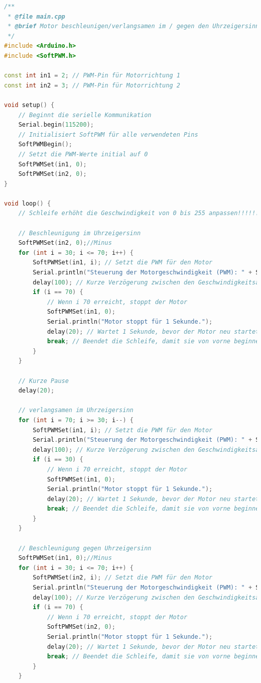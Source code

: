 \documentclass{vorlage-design-main}
\begin{document}
\begin{lstlisting}[language={C++}]
/**
 * @file main.cpp
 * @brief Motor beschleunigen/verlangsamen im / gegen den Uhrzeigersinn
 */
#include <Arduino.h>
#include <SoftPWM.h>

const int in1 = 2; // PWM-Pin für Motorrichtung 1
const int in2 = 3; // PWM-Pin für Motorrichtung 2

void setup() {
    // Beginnt die serielle Kommunikation
    Serial.begin(115200);
    // Initialisiert SoftPWM für alle verwendeten Pins
    SoftPWMBegin();
    // Setzt die PWM-Werte initial auf 0
    SoftPWMSet(in1, 0);
    SoftPWMSet(in2, 0);
}

void loop() {
    // Schleife erhöht die Geschwindigkeit von 0 bis 255 anpassen!!!!!!!!
    
    // Beschleunigung im Uhrzeigersinn
    SoftPWMSet(in2, 0);//Minus
    for (int i = 30; i <= 70; i++) {
        SoftPWMSet(in1, i); // Setzt die PWM für den Motor
        Serial.println("Steuerung der Motorgeschwindigkeit (PWM): " + String(i));
        delay(100); // Kurze Verzögerung zwischen den Geschwindigkeitsänderungen
        if (i == 70) {
            // Wenn i 70 erreicht, stoppt der Motor
            SoftPWMSet(in1, 0);
            Serial.println("Motor stoppt für 1 Sekunde.");
            delay(20); // Wartet 1 Sekunde, bevor der Motor neu startet
            break; // Beendet die Schleife, damit sie von vorne beginnen kann
        }
    }

    // Kurze Pause
    delay(20);

    // verlangsamen im Uhrzeigersinn
    for (int i = 70; i >= 30; i--) {
        SoftPWMSet(in1, i); // Setzt die PWM für den Motor
        Serial.println("Steuerung der Motorgeschwindigkeit (PWM): " + String(i));
        delay(100); // Kurze Verzögerung zwischen den Geschwindigkeitsänderungen
        if (i == 30) {
            // Wenn i 70 erreicht, stoppt der Motor
            SoftPWMSet(in1, 0);
            Serial.println("Motor stoppt für 1 Sekunde.");
            delay(20); // Wartet 1 Sekunde, bevor der Motor neu startet
            break; // Beendet die Schleife, damit sie von vorne beginnen kann
        }
    }

    // Beschleunigung gegen Uhrzeigersinn
    SoftPWMSet(in1, 0);//Minus
    for (int i = 30; i <= 70; i++) {
        SoftPWMSet(in2, i); // Setzt die PWM für den Motor
        Serial.println("Steuerung der Motorgeschwindigkeit (PWM): " + String(i));
        delay(100); // Kurze Verzögerung zwischen den Geschwindigkeitsänderungen
        if (i == 70) {
            // Wenn i 70 erreicht, stoppt der Motor
            SoftPWMSet(in2, 0);
            Serial.println("Motor stoppt für 1 Sekunde.");
            delay(20); // Wartet 1 Sekunde, bevor der Motor neu startet
            break; // Beendet die Schleife, damit sie von vorne beginnen kann
        }
    }


\end{lstlisting}
\end{document}

